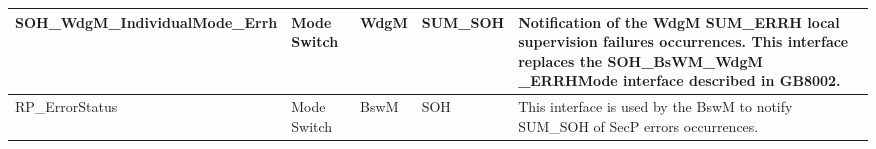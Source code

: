 \begin{longtable}{|l|l|l|l|l|}
\begin{minipage}{0.42\linewidth}\raggedright\vspace{.75ex}SOH\_WdgM\_IndividualMode\_Errh\vspace{.75ex}\end{minipage} & \begin{minipage}{0.07\linewidth}\raggedright\vspace{.75ex}Mode Switch\vspace{.75ex}\end{minipage} & \begin{minipage}{0.10\linewidth}\raggedright\vspace{.75ex}WdgM\vspace{.75ex}\end{minipage} & \begin{minipage}{0.10\linewidth}\raggedright\vspace{.75ex}SUM\_SOH\vspace{.75ex}\end{minipage} & \begin{minipage}{0.17\linewidth}\raggedright\vspace{.75ex}Notification of the WdgM SUM\_ERRH local supervision failures occurrences. \newline \footnotesize{This interface replaces the SOH\_BsWM\_WdgM \_ERRHMode interface described in GB8002.}\vspace{.75ex}\end{minipage}\\\hline
\begin{minipage}{0.42\linewidth}\raggedright\vspace{.75ex}RP\_ErrorStatus\vspace{.75ex}\end{minipage} & \begin{minipage}{0.07\linewidth}\raggedright\vspace{.75ex}Mode Switch\vspace{.75ex}\end{minipage} & \begin{minipage}{0.10\linewidth}\raggedright\vspace{.75ex}BswM\vspace{.75ex}\end{minipage} & \begin{minipage}{0.10\linewidth}\raggedright\vspace{.75ex}SOH\vspace{.75ex}\end{minipage} & \begin{minipage}{0.17\linewidth}\raggedright\vspace{.75ex}This interface is used by the BswM to notify SUM\_SOH of SecP errors occurrences.\vspace{.75ex}\end{minipage}\\\hline

\end{longtable}
